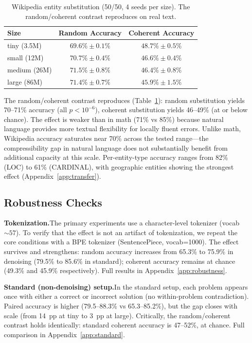 \documentclass{article}
\begin{document}
\begin{table}[t]
\centering
\begin{tabular}{lcc}
\toprule
Size & Random Accuracy & Coherent Accuracy \\
\midrule
tiny (3.5M)   & $\mathbf{69.6\% \pm 0.1\%}$ & $48.7\% \pm 0.5\%$ \\
small (12M)   & $\mathbf{70.7\% \pm 0.4\%}$ & $46.6\% \pm 0.4\%$ \\
medium (26M)  & $\mathbf{71.5\% \pm 0.8\%}$ & $46.4\% \pm 0.8\%$ \\
large (86M)   & $\mathbf{71.4\% \pm 0.7\%}$ & $45.9\% \pm 1.5\%$ \\
\bottomrule
\end{tabular}
\caption{Wikipedia entity substitution (50/50, 4 seeds per size). The random/coherent contrast reproduces on real text.}
\label{tab:wikipedia}
\end{table}

The random/coherent contrast reproduces (Table~\ref{tab:wikipedia}): random substitution yields 70--71\% accuracy (all $p < 10^{-6}$), coherent substitution yields 46--49\% (at or below chance). The effect is weaker than in math (71\% vs 85\%) because natural language provides more textual flexibility for locally fluent errors. Unlike math, Wikipedia accuracy saturates near 70\% across the tested range---the compressibility gap in natural language does not substantially benefit from additional capacity at this scale. Per-entity-type accuracy ranges from 82\% (LOC) to 61\% (CARDINAL), with geographic entities showing the strongest effect (Appendix~\ref{app:transfer}).

\subsection{Robustness Checks}
\label{sec:robustness}

\textbf{Tokenization.}\quad The primary experiments use a character-level tokenizer (vocab ${\sim}57$). To verify that the effect is not an artifact of tokenization, we repeat the core conditions with a BPE tokenizer (SentencePiece, vocab=1000). The effect survives and strengthens: random accuracy increases from 65.3\% to 75.9\% in denoising (79.5\% to 85.6\% in standard); coherent accuracy remains at chance (49.3\% and 45.9\% respectively). Full results in Appendix~\ref{app:robustness}.

\textbf{Standard (non-denoising) setup.}\quad In the standard setup, each problem appears once with either a correct or incorrect solution (no within-problem contradiction). Paired accuracy is higher (79.5--88.3\% vs 65.3--85.2\%), but the gap closes with scale (from 14~pp at tiny to 3~pp at large). Critically, the random/coherent contrast holds identically: standard coherent accuracy is 47--52\%, at chance. Full comparison in Appendix~\ref{app:standard}.
\end{document}
